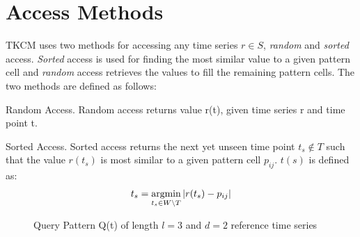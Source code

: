 \documentclass[abstracton,12pt]{scrreprt}
\begin{document}
\section{Access Methods}
\label{AccessMethods}
TKCM uses two methods for accessing any time series $r \in S$, \emph{random} and \emph{sorted} access. \emph{Sorted} access is used for finding the most similar value to a given pattern cell and \emph{random} access retrieves the values to fill the remaining pattern cells. The two methods are defined as follows: 
\begin{defn}
 	Random Access. Random access returns value r(t), given time series r and time point t.	
\end{defn}
\begin{defn}
	Sorted Access. Sorted access returns the next yet unseen time point $t_s \notin T$ such that the value $r(t_s)$ is most similar to a given pattern cell $p_{ij}$. $t(s)$ is defined as:
	\begin{align*}
	t_s = \argmin_{t_s \in W \setminus T} |r(t_s) - p_{ij}|
	\end{align*}
\end{defn}
\begin{figure}[H]
	\centering
\caption{Query Pattern Q(t) of length $l=3$ and $d=2$ reference time series}
\end{figure}
\end{document}
